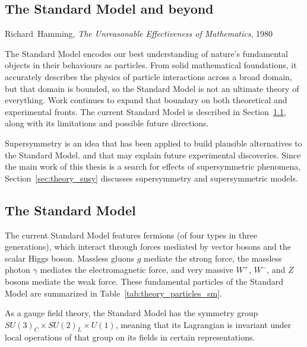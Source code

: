 \begin{singlespacing}
\chapter{The Standard Model and beyond}
\label{chapter:theory}
%
\begin{epigraphs}
%
{Richard~Hamming,
\textit{The Unreasonable Effectiveness of Mathematics},
1980~\cite{hamming1980unreasonable}}
\end{epigraphs}
\end{singlespacing}
\noindent
The Standard Model encodes our best understanding of nature's fundamental
objects in their behaviours as particles.
From solid mathematical foundations, it accurately describes the physics
of particle interactions across a broad domain,
but that domain is bounded, so the Standard Model is not an ultimate theory of
everything.
Work continues to expand that boundary on both theoretical and experimental
fronts.
The current Standard Model is described in Section~\ref{sec:theory_sm},
along with its limitations and possible future directions.

Supersymmetry is an idea that has been applied to build plausible alternatives
to the Standard Model. and that may explain future experimental discoveries.
Since the main work of this thesis is a search for effects of supersymmetric
phenomena, Section~\ref{sec:theory_susy} discusses supersymmetry and
supersymmetric models.


\section{The Standard Model}
\label{sec:theory_sm}
The current Standard Model features fermions
(of four types in three generations),
which interact through forces mediated by vector bosons
and the scalar Higgs boson.
Massless gluons $g$ mediate the strong force,
the massless photon $\gamma$ mediates the electromagnetic force,
and very massive $W^+$, $W^-$, and $Z$ bosons mediate the weak force.
These fundamental particles of the Standard Model are summarized in
Table~\ref{tab:theory_particles_sm}.

As a gauge field theory, the Standard Model has the symmetry group
$SU\!(3)_C \times SU\!(2)_L \times U\!(1)$,
meaning that its Lagrangian is invariant under local operations of that group
on its fields in certain representations.

